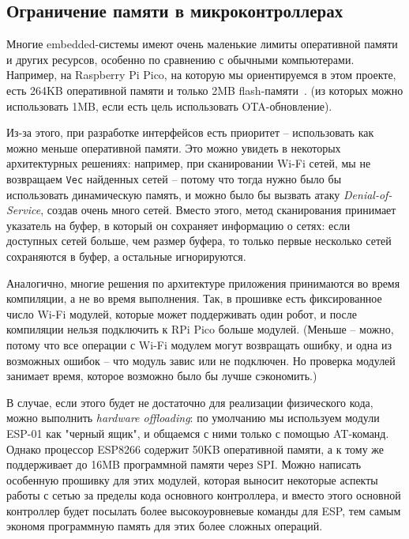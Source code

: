 \documentclass[%
]{article}
\begin{document}
\subsection{Ограничение памяти в микроконтроллерах}

Многие embedded-системы имеют очень маленькие лимиты оперативной
памяти и других ресурсов, особенно по сравнению с обычными компьютерами.
Например, на Raspberry Pi Pico, 
на которую мы ориентируемся в этом проекте,
есть 264KB оперативной памяти
и только 2MB flash-памяти~\cite{raspberrypi2021}.
(из которых можно использовать 1MB, если есть цель использовать OTA-обновление).

Из-за этого, при разработке интерфейсов есть приоритет --
использовать как можно меньше оперативной памяти.
Это можно увидеть в некоторых архитектурных решениях:
например, при сканировании Wi-Fi сетей,
мы не возвращаем \texttt{Vec} найденных сетей -- 
потому что тогда нужно было бы использовать динамическую память,
и можно было бы вызвать атаку \emph{Denial-of-Service},
создав очень много сетей.
Вместо этого, метод сканирования принимает указатель на буфер,
в который он сохраняет информацию о сетях:
если доступных сетей больше, чем размер буфера,
то только первые несколько сетей сохраняются в буфер,
а остальные игнорируются.

Аналогично, многие решения по архитектуре приложения
принимаются во время компиляции, а не во время выполнения.
Так, в прошивке есть фиксированное число Wi-Fi модулей,
которые может поддерживать один робот,
и после компиляции нельзя подключить к RPi Pico больше модулей.
(Меньше -- можно, потому что все операции с Wi-Fi модулем могут возвращать ошибку,
и одна из возможных ошибок -- что модуль завис или не подключен. Но проверка модулей
занимает время, которое возможно было бы лучше сэкономить.)

В случае, если этого будет не достаточно для реализации физического кода,
можно выполнить \emph{hardware offloading}:
по умолчанию мы используем модули ESP-01 как "черный ящик",
и общаемся с ними только с помощью AT-команд.
Однако процессор ESP8266 содержит 50KB оперативной памяти,
а к тому же поддерживает до 16MB программной памяти через SPI.
Можно написать особенную прошивку для этих модулей,
которая выносит некоторые аспекты работы с сетью
за пределы кода основного контроллера,
и вместо этого основной контроллер будет посылать более высокоуровневые
команды для ESP,
тем самым экономя программную память для этих более сложных операций.
\end{document}
